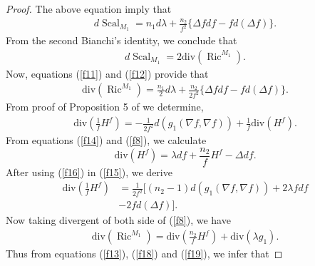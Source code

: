 \documentclass[pdflatex,sn-mathphys-num]{sn-jnl}%
\theoremstyle{thmstyleone}%
\theoremstyle{thmstyletwo}%
\theoremstyle{thmstylethree}%
\begin{document}
\begin{proof}
		The above equation imply that
		\begin{eqnarray}
			d\operatorname{Scal}_{M_1}= n_{1} d\lambda + \frac{n_2}{f^2}\{\Delta f df-fd(\Delta f) \}.\label{f11}
		\end{eqnarray}
		From the second Bianchi's identity, we conclude that
		\begin{eqnarray}
			d\operatorname{Scal}_{M_1}=2\mbox{div}(\operatorname{Ric}^{M_1}).\label{f12}
		\end{eqnarray}
		Now, equations (\ref{f11}) and (\ref{f12}) provide that
		\begin{eqnarray}
			\mbox{div}(\operatorname{Ric}^{M_1})=  \frac{n_1}{2} d\lambda + \frac{n_2}{2f^2}\{\Delta f df-fd(\Delta f) \}.\label{f13}
		\end{eqnarray}
		From proof of Proposition 5 of  \cite{kim} we  determine,
		\begin{eqnarray}
			\mbox{div}\left(\frac{1}{f}H^f\right)=-\frac{1}{2f^2}d(g_1(\nabla f,\nabla f))+\frac{1}{f}\mbox{div}(H^f).\label{f15}
		\end{eqnarray}
		From equations (\ref{f14}) and (\ref{f8}), we calculate
		\begin{equation}
			\mbox{div}(H^f)=\lambda df+\frac{n_2}{f} H^f - \Delta df .\label{f16}
		\end{equation}
		After using (\ref{f16}) in (\ref{f15}),  we derive	
		\begin{align}
			\mbox{div}\left(\frac{1}{f}H^f\right)&=\frac{1}{2f^2}\big[(n_2-1)d(g_1(\nabla f,\nabla f))+2\lambda f df\label{f18}\\
			&-2fd(\Delta f)\big].\nonumber
		\end{align}	
		Now taking divergent of both side of (\ref{f8}), we have
		\begin{eqnarray}
			\mbox{div}(\operatorname{Ric}^{M_1})=\mbox{div}\left(\frac{n_2}{f}H^f\right) + \mbox{div}(\lambda g_1)  .\label{f19}
		\end{eqnarray}
		Thus from equations (\ref{f13}), (\ref{f18}) and (\ref{f19}), we infer that


\end{proof}
\end{document}

